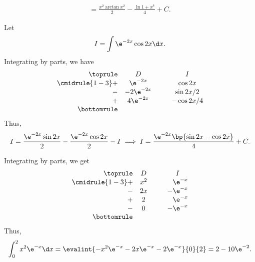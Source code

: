 \begin{solution}
\begin{ppart}
\begin{gather*}
            = \frac{x^2 \arctan x^2}2 - \frac{\ln{1 + x^4}}4 + C.
        \end{gather*}
    \end{ppart}
    \begin{ppart}
        Let \[I = \int \e^{-2x}\cos2x \d x.\] Integrating by parts, we have
        \[
            \begin{array}{r c @{\hspace*{1.0cm}} c}\toprule
                & D & I \\\cmidrule{1-3}
                + & \e^{-2x} & \cos 2x \\
                - & -2\e^{-2x} & \sin{2x}/2  \\
                + & 4\e^{-2x} & -\cos{2x}/4 \\\bottomrule
            \end{array}
        \]
        Thus, \[I = \frac{\e^{-2x} \sin 2x}2 - \frac{\e^{-2x} \cos 2x}2 - I \implies I = \frac{\e^{-2x} \bp{\sin 2x - \cos 2x}}4 + C.\]
    \end{ppart}
    \begin{ppart}
        Integrating by parts, we get
        \[
            \begin{array}{r c @{\hspace*{1.0cm}} c}\toprule
                & D & I \\\cmidrule{1-3}
                + & x^2 & \phantom{-}\e^{-x} \\
                - & 2x & -\e^{-x}  \\
                + & 2 & \phantom{-}\e^{-x} \\
                - & 0 & -\e^{-x}\\\bottomrule
            \end{array}
        \]
        Thus, \[\int_0^2 x^2 \e^{-x} \d x = \evalint{-x^2 \e^{-x} - 2x\e^{-x} - 2\e^{-x}}{0}{2} = 2 - 10\e^{-2}.\]
    \end{ppart}
\end{solution}

